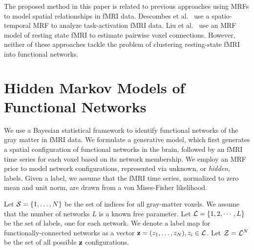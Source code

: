 \documentclass[runningheads, a4paper]{llncs}
\begin{document}
The proposed method in this paper is related to previous approaches using MRFs
to model spatial relationships in fMRI data. Descombes et
al.~\cite{descombes_spatio-temporal_1998} use a spatio-temporal MRF to analyze
task-activation fMRI data. Liu et al.~\cite{liu2010spatial} use an MRF model of
resting state fMRI to estimate pairwise voxel connections. However, neither of
these approaches tackle the problem of clustering resting-state fMRI into
functional networks.

\section {Hidden Markov Models of Functional Networks}\label{sec:models}
We use a Bayesian statistical framework to identify functional networks of the
gray matter in fMRI data. We formulate a generative model, which first generates
a spatial configuration of functional networks in the brain, followed by an fMRI
time series for each voxel based on its network membership. We employ an MRF
prior to model network configurations, represented via unknown, or
\emph{hidden}, labels. Given a label, we assume that the fMRI time series,
normalized to zero mean and unit norm, are drawn from a von Mises-Fisher
likelihood.


Let $\mathcal{S} = \{1, \ldots, N\}$ be the set of indices for all gray-matter
voxels. We assume that the number of networks $L$ is a known free parameter. Let
$\mathcal{L} = \{1, 2, \cdots, L\}$ be the set of labels, one for each network. We
denote a label map for functionally-connected networks as a vector $\text{\bf z} =
(z_1,\dots, z_N), z_i \in \mathcal{L}$.
Let $\mathcal{Z} = \mathcal{L}^N$ be the set of all possible $\text{\bf z}$ configurations.
\end{document}
